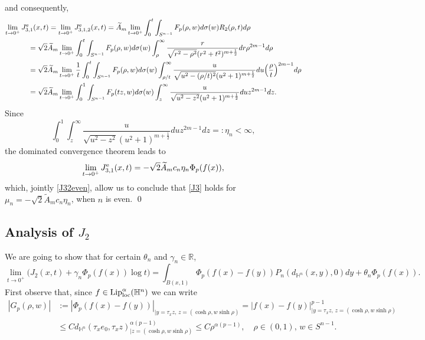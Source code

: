 \documentclass[a4paper,10pt, reqno]{amsart}
\theoremstyle{definition}
\theoremstyle{remark}
\numberwithin{equation}{section}
\begin{document}
{$$$$
and consequently,
\begin{align*}
\lim_{t\rightarrow 0^+}J_{3,1}^{\rm e}(x,t)&=\lim_{t\rightarrow 0^+}J_{3,1,2}^{\rm e}(x,t)=\widetilde{A}_m\lim_{t\rightarrow 0^+}\int_0^t\int_{S^{n-1}}F_p(\rho ,w)d\sigma (w)R_2(\rho ,t )d\rho\\
&\hspace{-1cm}=\sqrt{2}\widetilde{A}_m\lim_{t\rightarrow 0^+}\int_0^t\int_{S^{n-1}}F_p(\rho ,w)d\sigma (w)\int_\rho ^\infty \frac{r}{\sqrt{r^2-\rho ^2}(r^2+t^2)^{m+\frac{1}{2}}}dr\rho ^{2m-1}d\rho\\
&\hspace{-1cm}=\sqrt{2}\widetilde{A}_m\lim_{t\rightarrow 0^+}\frac{1}{t}\int_0^t\int_{S^{n-1}}F_p(\rho, w)d\sigma (w)\int_{\rho/t}^\infty \frac{u}{\sqrt{u^2-(\rho/t)^2}(u^2+1)^{m+\frac{1}{2}}}du\Big(\frac{\rho}{t}\Big)^{2m-1}d\rho\\
&\hspace{-1cm}=\sqrt{2}\widetilde{A}_m\lim_{t\rightarrow 0^+}\int_0^1\int_{S^{n-1}}F_p(tz,w)d\sigma (w)\int_z^\infty \frac{u}{\sqrt{u^2-z^2}(u^2+1)^{m+\frac{1}{2}}}duz^{2m-1}dz.
\end{align*}
Since
$$
\int_0^1\int_z^\infty \frac{u}{\sqrt{u^2-z^2}(u^2+1)^{m+\frac{1}{2}}}duz^{2m-1}dz=:\eta_n<\infty,
$$
the dominated convergence theorem leads to
$$
\lim_{t\rightarrow 0^+}J_{3,1}^{\rm e}(x,t)=-\sqrt{2}\widetilde{A}_mc_n\eta_n\Phi_p(f(x)),
$$
which, jointly \eqref{J32even}, allow us to conclude that \eqref{J3} holds for $\mu_n=-\sqrt{2}\widetilde{A}_mc_n\eta_n$, when $n$ is even.
\qed

\subsection{Analysis of $J_2$} We are going to show that for certain $\theta_n$ and $\gamma_n \in \mathbb R$, 
\begin{equation}\label{J2}
\lim_{t\rightarrow 0^+}\big(J_2(x,t)+\gamma_n \Phi _p(f(x))\log t\big)=\int_{B(x,1)}\Phi _p(f(x)-f(y))P_n(d_{\mathbb H^n}(x,y),0)dy+\theta_n\Phi _p(f(x)).
\end{equation}
First observe that, since $f\in {\rm Lip}_{\rm loc}^\alpha (\mathbb H^n)$ we can write
\begin{align}\label{PhipLip}
    |G_p(\rho, w)|&:=|\Phi _p(f(x)-f(y))|_{|y=\tau_x z,\,z=(\cosh \rho,w\sinh \rho)}=|f(x)-f(y)|^{p-1}_{|y=\tau_x z,\,z=(\cosh \rho,w\sinh \rho)}\nonumber\\
    &\leq Cd_{\mathbb H^n}(\tau _xe_0,\tau _x z)_{|z=(\cosh \rho,w\sinh \rho)}^{\alpha (p-1)}\leq C\rho ^{\alpha (p-1)},\quad \rho \in (0,1),\,w\in S^{n-1}.
\end{align}

}
\end{document}
